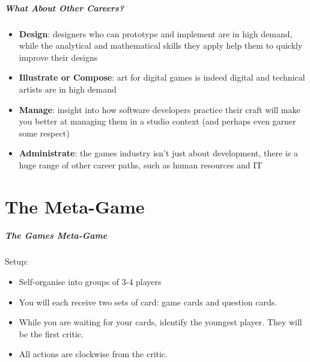 \begin{frame}
	\frametitle{What About Other Careers?}
	
	\begin{itemize}
		\item 	\textbf{Design}: designers who can prototype and implement are in high demand, while the analytical and mathematical skills they apply help them to quickly improve their designs \pause
		\item 	\textbf{Illustrate or Compose}: art for digital games is indeed digital and technical artists are in high demand \pause
		\item 	\textbf{Manage}: insight into how software developers practice their craft will make you better at managing them in a studio context 
			(and perhaps even garner some respect) \pause
		\item 	\textbf{Administrate}: the games industry isn't just about development, there is a huge range of other career paths,
			such as human resources and IT
	\end{itemize}
\end{frame}


\part{The Meta-Game}
\frame{\partpage}

\begin{frame}
	\frametitle{The Games Meta-Game}
	
	Setup:
	
	\begin{itemize}
		\item Self-organise into groups of 3-4 players
		\item You will each receive two sets of card: game cards and question cards.
		\item While you are waiting for your cards, identify the youngest player. They will be the first critic.
		\item All actions are clockwise from the critic.
	\end{itemize}
\end{frame}


